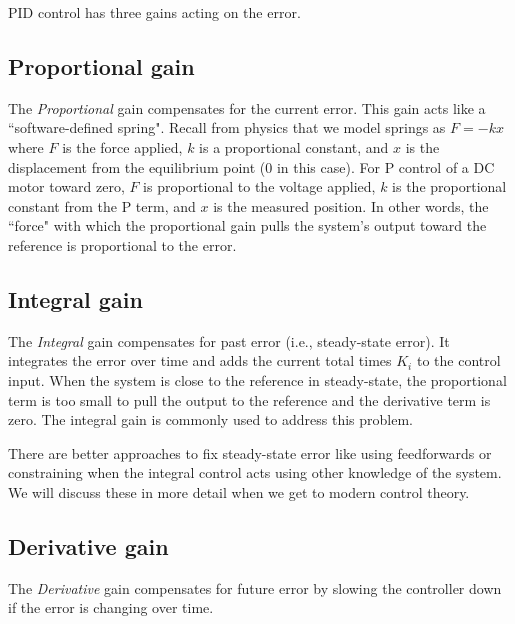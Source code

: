 PID control has three gains acting on the \gls{error}.

\subsection{Proportional gain}

The \textit{Proportional} gain compensates for the current \gls{error}. This
gain acts like a ``software-defined spring". Recall from physics that we model
springs as $F = -kx$ where $F$ is the force applied, $k$ is a proportional
constant, and $x$ is the displacement from the equilibrium point ($0$ in this
case). For P control of a DC motor toward zero, $F$ is proportional to the
voltage applied, $k$ is the proportional constant from the P term, and $x$ is
the measured position. In other words, the ``force" with which the proportional
gain pulls the \gls{system}'s \gls{output} toward the \gls{reference} is
proportional to the \gls{error}.

\subsection{Integral gain}

The \textit{Integral} gain compensates for past \gls{error} (i.e.,
\gls{steady-state error}). It integrates the \gls{error} over time and adds the
current total times $K_i$ to the \gls{control input}. When the \gls{system} is
close to the \gls{reference} in steady-state, the proportional term is too small
to pull the \gls{output} to the \gls{reference} and the derivative term is zero.
The integral gain is commonly used to address this problem.

There are better approaches to fix \gls{steady-state error} like using
feedforwards or constraining when the integral control acts using other
knowledge of the \gls{system}. We will discuss these in more detail when we get
to modern control theory.

\subsection{Derivative gain}

The \textit{Derivative} gain compensates for future \gls{error} by slowing the
controller down if the \gls{error} is changing over time.
